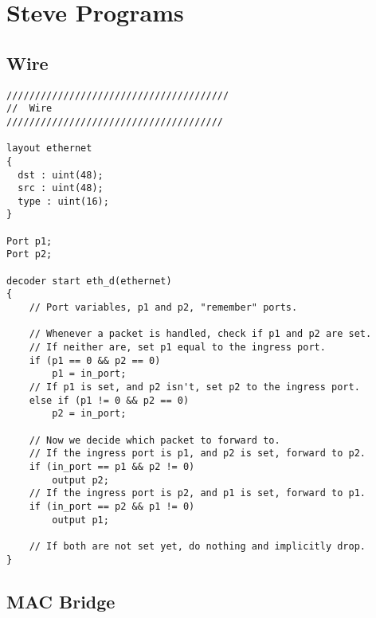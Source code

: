 \section{Steve Programs} \label{ap:steve_programs}

\subsection{Wire}

\begin{lstlisting}
///////////////////////////////////////
//  Wire
//////////////////////////////////////

layout ethernet
{
  dst : uint(48);
  src : uint(48);
  type : uint(16);
}

Port p1;
Port p2;

decoder start eth_d(ethernet)
{
	// Port variables, p1 and p2, "remember" ports.

	// Whenever a packet is handled, check if p1 and p2 are set.
	// If neither are, set p1 equal to the ingress port.
	if (p1 == 0 && p2 == 0)
		p1 = in_port;
	// If p1 is set, and p2 isn't, set p2 to the ingress port.
	else if (p1 != 0 && p2 == 0)
		p2 = in_port;

	// Now we decide which packet to forward to.
	// If the ingress port is p1, and p2 is set, forward to p2.
	if (in_port == p1 && p2 != 0)
		output p2;
	// If the ingress port is p2, and p1 is set, forward to p1.
	if (in_port == p2 && p1 != 0)
		output p1;

	// If both are not set yet, do nothing and implicitly drop.
}
\end{lstlisting}

\subsection{MAC Bridge}

